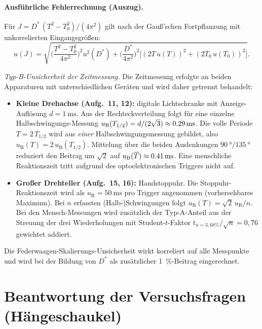 \documentclass[11pt,a4paper]{article}
\begin{document}
\paragraph{Ausführliche Fehlerrechnung (Auszug).}
Für $J = D^{*}\,(T^{2}-T_{0}^{2})/(4\pi^{2})$ gilt nach der
Gauß'schen Fortpflanzung mit unkorrelierten Eingangsgrößen:
\begin{equation}
  u(J) = \sqrt{\Big(\frac{T^{2}-T_{0}^{2}}{4\pi^{2}}\Big)^{2} u^{2}(D^{*})
   + \Big(\frac{D^{*}}{4\pi^{2}}\Big)^{2}\big[(2T\,u(T))^{2} + (2T_{0}\,u(T_{0}))^{2}\big]}.
   \tag{21}
\end{equation}

\emph{Typ-B-Unsicherheit der Zeitmessung.} Die Zeitmessung erfolgte
an beiden Apparaturen mit unterschiedlichen Geräten und wird daher
getrennt behandelt:
\begin{itemize}
  \item \textbf{Kleine Drehachse (Aufg.~11, 12):} digitale
        Lichtschranke mit Anzeige-Auflösung $d=\SI{1}{\milli\second}$.
        Aus der Rechteckverteilung folgt für eine einzelne
        Halbschwingungs-Messung
        $u_{\mathrm{B}}(T_{1/2}) = d/(2\sqrt{3}) \approx \SI{0{,}29}{\milli\second}$.
        Die volle Periode $T = 2\,T_{1/2}$ wird aus
        \emph{einer} Halbschwingungsmessung gebildet, also
        $u_{\mathrm{B}}(T) = 2\,u_{\mathrm{B}}(T_{1/2})$.
        Mittelung über die beiden Auslenkungen
        $\SI{90}{\degree}/\SI{135}{\degree}$ reduziert den Beitrag um
        $\sqrt{2}$ auf $u_{\mathrm{B}}(\overline{T}) \approx
        \SI{0{,}41}{\milli\second}$. Eine menschliche Reaktionszeit
        tritt aufgrund des optoelektronischen Triggers nicht auf.
  \item \textbf{Großer Drehteller (Aufg.~15, 16):} Handstoppuhr.
        Die Stoppuhr-Reaktionszeit wird als
        $u_{\mathrm{R}}=\SI{50}{\milli\second}$ pro Trigger
        angenommen (vorhersehbares Maximum). Bei $n$ erfassten
        (Halb-)Schwingungen folgt $u_{\mathrm{B}}(T) = \sqrt{2}\,
        u_{\mathrm{R}}/n$. Bei den Mensch-Messungen wird zusätzlich
        der Typ-A-Anteil aus der Streuung der drei Wiederholungen
        mit Student-$t$-Faktor $t_{n=3,68\%}/\sqrt{n}=0{,}76$
        gewichtet addiert.
\end{itemize}
Die Federwaagen-Skalierungs-Unsicherheit wirkt korreliert auf alle
Messpunkte und wird bei der Bildung von $D^{*}$ als zusätzlicher
\SI{1}{\percent}-Beitrag eingerechnet.

\section{Beantwortung der Versuchsfragen (Hängeschaukel)}
\end{document}
